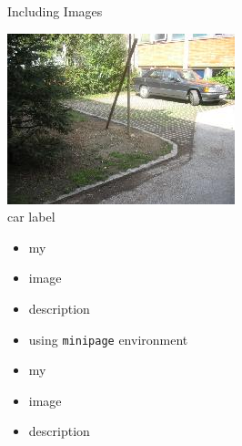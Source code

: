 \documentclass[xcolor=table,mathserif,9pt]{beamer}    %
\begin{document}
\begin{frame}{Including Images}
\begin{minipage}[b]{.4\linewidth}
  \begin{center}
    \includegraphics[width=.5\linewidth]{images/car}\\
    car label
  \end{center}
\end{minipage}
\begin{minipage}[b]{.4\linewidth}
  \begin{itemize}
  \item my
  \item image
  \item description
  \item using \texttt{minipage} environment
  \item my
  \item image
  \item description
  \end{itemize}
\end{minipage}
\end{frame}
\end{document}
